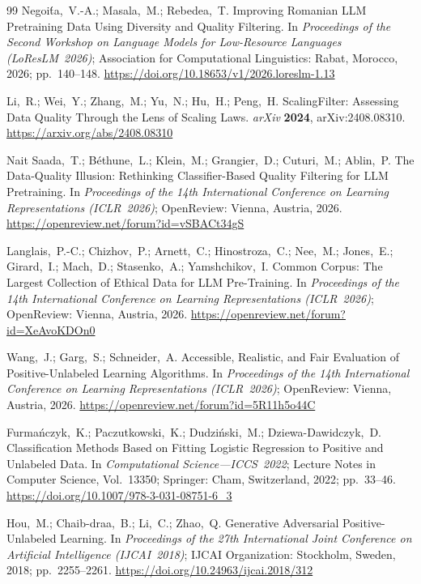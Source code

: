 \documentclass[applsci,article,submit,pdftex,moreauthors]{Definitions/mdpi}
\begin{document}
\begin{thebibliography}{99}
Negoi\'{t}a,~V.-A.; Masala,~M.; Rebedea,~T.
Improving Romanian LLM Pretraining Data Using Diversity and Quality Filtering.
In \textit{Proceedings of the Second Workshop on Language Models for
Low-Resource Languages (LoResLM~2026)};
Association for Computational Linguistics: Rabat, Morocco, 2026; pp.~140--148.
\url{https://doi.org/10.18653/v1/2026.loreslm-1.13}

Li,~R.; Wei,~Y.; Zhang,~M.; Yu,~N.; Hu,~H.; Peng,~H.
ScalingFilter: Assessing Data Quality Through the Lens of Scaling Laws.
\textit{arXiv} \textbf{2024}, arXiv:2408.08310.
\url{https://arxiv.org/abs/2408.08310}

Nait Saada,~T.; B\'{e}thune,~L.; Klein,~M.; Grangier,~D.; Cuturi,~M.; Ablin,~P.
The Data-Quality Illusion: Rethinking Classifier-Based Quality Filtering
for LLM Pretraining.
In \textit{Proceedings of the 14th International Conference on Learning
Representations (ICLR~2026)};
OpenReview: Vienna, Austria, 2026.
\url{https://openreview.net/forum?id=vSBACt34gS}

Langlais,~P.-C.; Chizhov,~P.; Arnett,~C.; Hinostroza,~C.; Nee,~M.;
Jones,~E.; Girard,~I.; Mach,~D.; Stasenko,~A.; Yamshchikov,~I.
Common Corpus: The Largest Collection of Ethical Data for LLM Pre-Training.
In \textit{Proceedings of the 14th International Conference on Learning
Representations (ICLR~2026)};
OpenReview: Vienna, Austria, 2026.
\url{https://openreview.net/forum?id=XeAvoKDOn0}

Wang,~J.; Garg,~S.; Schneider,~A.
Accessible, Realistic, and Fair Evaluation of Positive-Unlabeled
Learning Algorithms.
In \textit{Proceedings of the 14th International Conference on Learning
Representations (ICLR~2026)};
OpenReview: Vienna, Austria, 2026.
\url{https://openreview.net/forum?id=5R11h5o44C}

Furma\'{n}czyk,~K.; Paczutkowski,~K.; Dudzi\'{n}ski,~M.; Dziewa-Dawidczyk,~D.
Classification Methods Based on Fitting Logistic Regression to Positive
and Unlabeled Data.
In \textit{Computational Science---ICCS~2022};
Lecture Notes in Computer Science, Vol.~13350;
Springer: Cham, Switzerland, 2022; pp.~33--46.
\url{https://doi.org/10.1007/978-3-031-08751-6_3}

Hou,~M.; Chaib-draa,~B.; Li,~C.; Zhao,~Q.
Generative Adversarial Positive-Unlabeled Learning.
In \textit{Proceedings of the 27th International Joint Conference on
Artificial Intelligence (IJCAI~2018)};
IJCAI Organization: Stockholm, Sweden, 2018; pp.~2255--2261.
\url{https://doi.org/10.24963/ijcai.2018/312}


\end{thebibliography}
\end{document}
